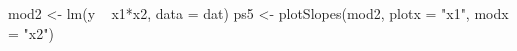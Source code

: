 \begin{Schunk}
\begin{Sinput}
 mod2 <- lm(y ~ x1*x2, data = dat) 
 ps5 <- plotSlopes(mod2, plotx = "x1", modx = "x2")
\end{Sinput}
\end{Schunk}
